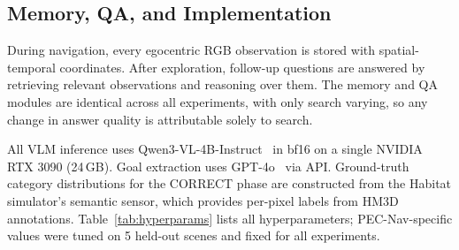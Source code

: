 \documentclass[10pt,twocolumn,letterpaper]{article}
\begin{document}
\subsection{Memory, QA, and Implementation}
\label{sec:memory}

During navigation, every egocentric RGB observation is stored with spatial-temporal coordinates. After exploration, follow-up questions are answered by retrieving relevant observations and reasoning over them. The memory and QA modules are identical across all experiments, with only search varying, so any change in answer quality is attributable solely to search.

All VLM inference uses Qwen3-VL-4B-Instruct~\cite{bai2025qwen3} in bf16 on a single NVIDIA RTX 3090 (24\,GB). Goal extraction uses GPT-4o~\cite{openai2024gpt4o} via API. Ground-truth category distributions for the CORRECT phase are constructed from the Habitat simulator's semantic sensor, which provides per-pixel labels from HM3D annotations. Table~\ref{tab:hyperparams} lists all hyperparameters; PEC-Nav-specific values were tuned on 5 held-out scenes and fixed for all experiments.

\begin{table}[H]
\centering
\caption{PEC-Nav hyperparameters. $\dagger$: inherited from base system.}
\label{tab:hyperparams}
\vspace{1mm}
\end{table}
\end{document}
